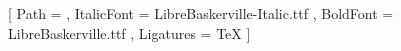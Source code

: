 \setmainfont{LibreBaskerville.ttf}[
  Path = \fontdir , ItalicFont = LibreBaskerville-Italic.ttf ,
  BoldFont = LibreBaskerville.ttf , Ligatures = TeX ]
